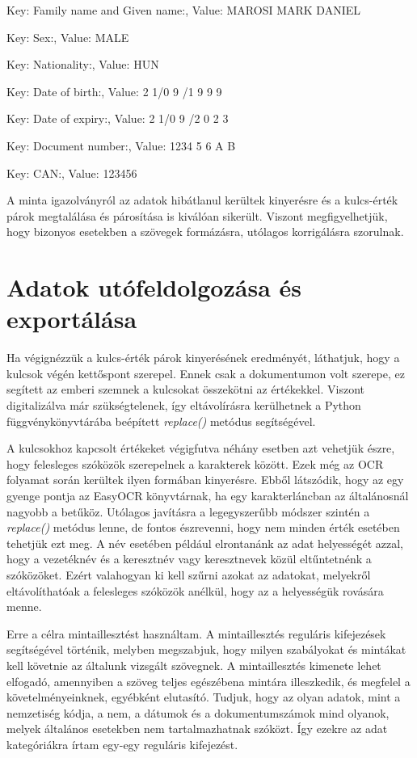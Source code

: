 \documentclass[12pt]{report}
\begin{document}
\begin{tcolorbox}
    Key: Family name and Given name:, Value: MAROSI MARK DANIEL

    Key: Sex:, Value: MALE

    Key: Nationality:, Value: HUN

    Key: Date of birth:, Value: 2 1/0 9 /1 9 9 9

    Key: Date of expiry:, Value: 2 1/0 9 /2 0 2 3

    Key: Document number:, Value: 1234 5 6 A B

    Key: CAN:, Value: 123456
\end{tcolorbox}

A minta igazolványról az adatok hibátlanul kerültek kinyerésre és a kulcs-érték párok megtalálása és párosítása is kiválóan sikerült. Viszont megfigyelhetjük, hogy bizonyos esetekben a szövegek formázásra, utólagos korrigálásra szorulnak.

\section{Adatok utófeldolgozása és exportálása}

Ha végignézzük a kulcs-érték párok kinyerésének eredményét, láthatjuk, hogy a kulcsok végén kettőspont szerepel. Ennek csak a dokumentumon volt szerepe, ez segített az emberi szemnek a kulcsokat összekötni az értékekkel. Viszont digitalizálva már szükségtelenek, így eltávolírásra kerülhetnek a Python függvénykönyvtárába beépített \emph{replace()} metódus segítségével.

A kulcsokhoz kapcsolt értékeket végigfutva néhány esetben azt vehetjük észre, hogy felesleges szóközök szerepelnek a karakterek között. Ezek még az OCR folyamat során kerültek ilyen formában kinyerésre. Ebből látszódik, hogy az egy gyenge pontja az EasyOCR könyvtárnak, ha egy karakterláncban az általánosnál nagyobb a betűköz. Utólagos javításra a legegyszerűbb módszer szintén a \emph{replace()} metódus lenne, de fontos észrevenni, hogy nem minden érték esetében tehetjük ezt meg. A név esetében például elrontanánk az adat helyességét azzal, hogy a vezetéknév és a keresztnév vagy keresztnevek közül eltűntetnénk a szóközöket. 
Ezért valahogyan ki kell szűrni azokat az adatokat, melyekről eltávolíthatóak a felesleges szóközök anélkül, hogy az a helyességük rovására menne.

Erre a célra mintaillesztést használtam. A mintaillesztés reguláris kifejezések segítségével történik, melyben megszabjuk, hogy milyen szabályokat és mintákat kell követnie az általunk vizsgált szövegnek. A mintaillesztés kimenete lehet elfogadó, amennyiben a szöveg teljes egészébena mintára illeszkedik, és megfelel a követelményeinknek, egyébként elutasító.
Tudjuk, hogy az olyan adatok, mint a nemzetiség kódja, a nem, a dátumok és a dokumentumszámok mind olyanok, melyek általános esetekben nem tartalmazhatnak szóközt. Így ezekre az adat kategóriákra írtam egy-egy reguláris kifejezést.
\end{document}
